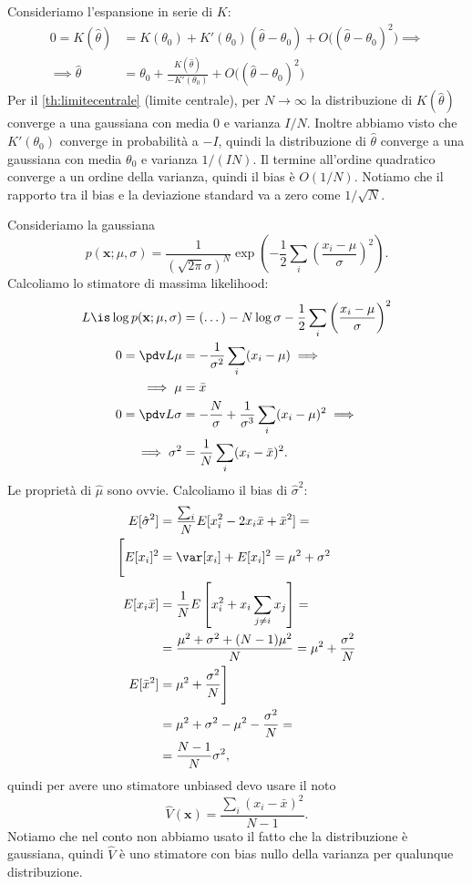 Consideriamo l'espansione in serie di $K$:
\begin{align*}
	0 = K(\hat\theta)
	&= K(\theta_0) + K'(\theta_0)(\hat\theta-\theta_0) + O\big((\hat\theta-\theta_0)^2\big) \implies \\
	\implies \hat\theta
	&= \theta_0 + \frac{K(\hat\theta)}{-K'(\theta_0)} + O\big((\hat\theta-\theta_0)^2\big)
\end{align*}
Per il \autoref{th:limitecentrale} (limite centrale),
per $N\to\infty$
la distribuzione di $K(\hat\theta)$ converge a una gaussiana
con media 0 e varianza $I/N$.
Inoltre abbiamo visto che $K'(\theta_0)$ converge in probabilità a $-I$,
quindi la distribuzione di $\hat\theta$ converge a una gaussiana
con media $\theta_0$ e varianza $1/(IN)$.
Il termine all'ordine quadratico converge a un ordine della varianza,
quindi il bias è $O(1/N)$.
Notiamo che il rapporto tra il bias e la deviazione standard va a zero come $1/\sqrt{N}$.

\begin{example}
	Consideriamo la gaussiana
	\begin{equation*}
		p(\mathbf x;\mu,\sigma)
		= \frac1{(\sqrt{2\pi}\sigma)^N} \exp \left( -\frac12\sum_i\left(\frac{x_i-\mu}\sigma\right)^2 \right).
	\end{equation*}
	Calcoliamo lo stimatore di massima likelihood:
	\begin{align*}
		L \is \log p(\mathbf x;\mu,\sigma)
		&= (\dots) - N\log\sigma - \frac12 \sum_i \left( \frac{x_i-\mu}\sigma \right)^2 \\
		0 = \pdv L\mu
		&= -\frac1{\sigma^2}\sum_i (x_i-\mu) \implies \\
		\implies \mu
		&= \bar x \\
		0 = \pdv L\sigma
		&= -\frac N\sigma + \frac1{\sigma^3}\sum_i (x_i-\mu)^2 \implies \\
		\implies \sigma^2
		&= \frac1N \sum_i (x_i-\bar x)^2.
	\end{align*}
	Le proprietà di $\hat\mu$ sono ovvie.
	Calcoliamo il bias di $\hat\sigma^2$:
	\begin{align*}
		E[\hat\sigma^2]
		&= \frac{\sum_i}N E[x_i^2 - 2x_i\bar x + \bar x^2] = \\
		\Bigg[ E[x_i]^2
		&= \var[x_i] + E[x_i]^2
		= \mu^2 + \sigma^2 \\
		E[x_i\bar x]
		&= \frac 1N E \left[ x_i^2 + x_i \sum_{j\neq i} x_j \right] = \\
		&= \frac{\mu^2 + \sigma^2 + (N-1)\mu^2}N
		= \mu^2 + \frac{\sigma^2}N \\
		E[\bar x^2]
		&= \mu^2 + \frac{\sigma^2}N \Bigg] \\
		&= \mu^2 + \sigma^2 - \mu^2 - \frac{\sigma^2}N = \\
		&= \frac{N-1}N \sigma^2,
	\end{align*}
	quindi per avere uno stimatore unbiased devo usare il noto
	\begin{equation*}
		\hat V(\mathbf x)
		= \frac{\sum_i (x_i-\bar x)^2}{N-1}.
	\end{equation*}
	Notiamo che nel conto non abbiamo usato il fatto che la distribuzione è gaussiana,
	quindi $\hat V$ è uno stimatore con bias nullo della varianza per qualunque distribuzione.
\end{example}


